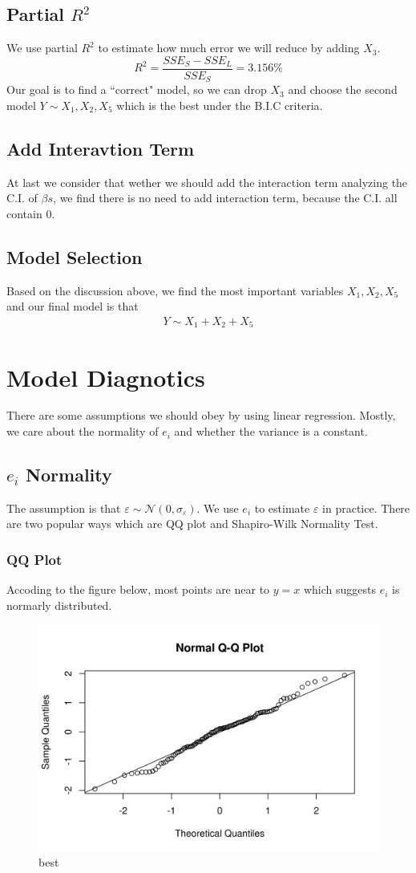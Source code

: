 \documentclass[a4paper,11pt,onecolumn,twoside]{article}
\begin{document}
\subsection{Partial $R^2$}
We use partial $R^2$ to estimate how much error we will reduce by adding $X_3$.
\begin{equation}
R^2=\frac{SSE_{S}-SSE_{L}}{SSE_{S}}=3.156\%
\end{equation}
Our goal is to find a ``correct" model, so we can drop $X_3$ and choose the second model $Y\sim X_1,X_2,X_5$ which is the best under the B.I.C criteria.
\subsection{Add Interavtion Term}
At last we consider that wether we should add the interaction term analyzing the C.I. of $\beta s$, we find there is no need to add interaction term, because the C.I. all contain 0.
\subsection{Model Selection}
Based on the discussion above, we find the most important variables $X_1,X_2,X_5$ and our final model is that
\begin{equation}
\begin{split}
Y\sim X_1+X_2+X_5
\end{split}
\end{equation}
\section{Model Diagnotics}
There are some assumptions we should obey by using linear regression. Mostly, we care about the normality of $e_i$ and whether the variance is a constant.
\subsection{$e_i$ Normality}
The assumption is that $\varepsilon\sim \mathcal N(0,\sigma_{\varepsilon})$. We use $e_i$ to estimate $\varepsilon$ in practice. There are two popular ways which are QQ plot and Shapiro-Wilk Normality Test.
\subsubsection{QQ Plot}
Accoding to the figure below, most points are near to $y=x$ which suggests $e_i$ is normarly distributed.
 \begin{figure}[H]
	\centering
	\includegraphics[width=.65\textwidth,height=.35\textheight]{qqplot.png} %
	\caption{best} %
\end{figure}
\end{document}
